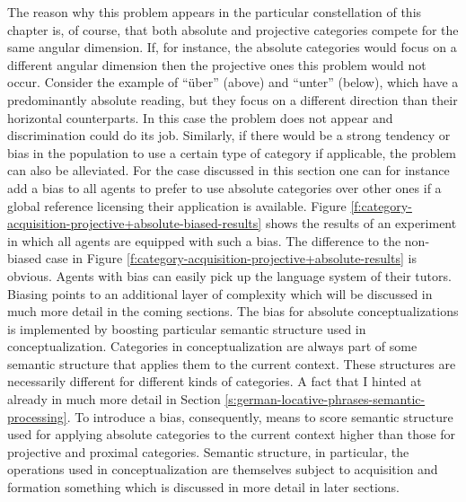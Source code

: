 The reason why this problem appears in the particular constellation of this chapter is, of course, 
that both absolute and projective categories compete for the same angular dimension. 
If, for instance, the absolute categories would focus on a different angular dimension then
the projective ones this problem would not occur. Consider the 
example of ``\"uber'' (above) and ``unter'' (below), which have a 
predominantly absolute reading, but they focus on a
different direction than their horizontal counterparts. In this case the problem
does not appear and discrimination could do its job. Similarly, if there would 
be a strong tendency or bias in the population to use a certain type of category if applicable, 
the problem can also be alleviated. 
For the case discussed in this section one can for instance add a bias to all agents 
to prefer to use absolute categories over other ones if a global reference licensing 
their application is available. Figure 
\ref{f:category-acquisition-projective+absolute-biased-results}
shows the results of  an experiment in which all agents are equipped with such a bias.
The difference to the non-biased case in Figure \ref{f:category-acquisition-projective+absolute-results}
is obvious. Agents with bias can easily pick up the language system of their tutors. 
Biasing points to an additional layer of complexity which will be discussed in much
more detail in the coming sections. The bias for absolute conceptualizations 
is implemented by boosting particular
semantic structure used in conceptualization. Categories in conceptualization
are always part of some semantic structure that applies them to the current context.
These structures are necessarily different for different kinds of categories. A fact that
I hinted at already in much more detail in Section \ref{s:german-locative-phrases-semantic-processing}.
To introduce a bias, consequently, means to score semantic structure used for applying absolute categories
to the current context higher than those for projective and proximal categories.
Semantic structure, in particular, the operations used in conceptualization are 
themselves subject to acquisition and formation something which is discussed
in more detail in later sections. 


